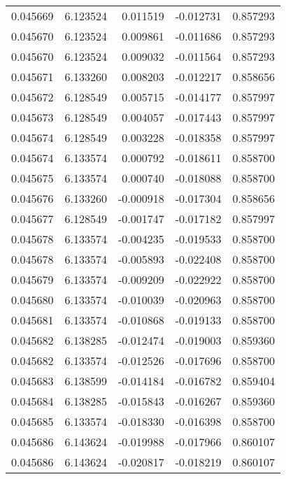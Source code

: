 \begin{tabular}{lrrrr}
0.045669    &  6.123524 &  0.011519 & -0.012731 &             0.857293 \\
0.045670    &  6.123524 &  0.009861 & -0.011686 &             0.857293 \\
0.045670    &  6.123524 &  0.009032 & -0.011564 &             0.857293 \\
0.045671    &  6.133260 &  0.008203 & -0.012217 &             0.858656 \\
0.045672    &  6.128549 &  0.005715 & -0.014177 &             0.857997 \\
0.045673    &  6.128549 &  0.004057 & -0.017443 &             0.857997 \\
0.045674    &  6.128549 &  0.003228 & -0.018358 &             0.857997 \\
0.045674    &  6.133574 &  0.000792 & -0.018611 &             0.858700 \\
0.045675    &  6.133574 &  0.000740 & -0.018088 &             0.858700 \\
0.045676    &  6.133260 & -0.000918 & -0.017304 &             0.858656 \\
0.045677    &  6.128549 & -0.001747 & -0.017182 &             0.857997 \\
0.045678    &  6.133574 & -0.004235 & -0.019533 &             0.858700 \\
0.045678    &  6.133574 & -0.005893 & -0.022408 &             0.858700 \\
0.045679    &  6.133574 & -0.009209 & -0.022922 &             0.858700 \\
0.045680    &  6.133574 & -0.010039 & -0.020963 &             0.858700 \\
0.045681    &  6.133574 & -0.010868 & -0.019133 &             0.858700 \\
0.045682    &  6.138285 & -0.012474 & -0.019003 &             0.859360 \\
0.045682    &  6.133574 & -0.012526 & -0.017696 &             0.858700 \\
0.045683    &  6.138599 & -0.014184 & -0.016782 &             0.859404 \\
0.045684    &  6.138285 & -0.015843 & -0.016267 &             0.859360 \\
0.045685    &  6.133574 & -0.018330 & -0.016398 &             0.858700 \\
0.045686    &  6.143624 & -0.019988 & -0.017966 &             0.860107 \\
0.045686    &  6.143624 & -0.020817 & -0.018219 &             0.860107 \\

\end{tabular}
